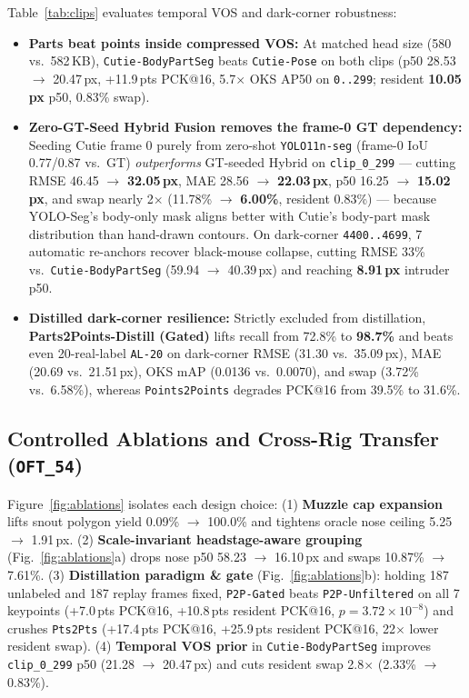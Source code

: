 \documentclass[10pt,twocolumn,letterpaper]{article}
\begin{document}
Table~\ref{tab:clips} evaluates temporal VOS and dark-corner robustness:
\begin{itemize}[leftmargin=*,itemsep=0.5pt,topsep=1.5pt]
  \item \textbf{Parts beat points inside compressed VOS:} At matched head size (580 vs.\ 582\,KB), \texttt{Cutie-BodyPartSeg} beats \texttt{Cutie-Pose} on both clips (p50 28.53 $\to$ 20.47\,px, +11.9\,pts PCK@16, 5.7$\times$ OKS AP50 on \texttt{0..299}; resident \textbf{10.05\,px} p50, 0.83\% swap).
  \item \textbf{Zero-GT-Seed Hybrid Fusion removes the frame-0 GT dependency:} Seeding Cutie frame 0 purely from zero-shot \texttt{YOLO11n-seg} (frame-0 IoU 0.77/0.87 vs.\ GT) \emph{outperforms} GT-seeded Hybrid on \texttt{clip\_0\_299} — cutting RMSE 46.45 $\to$ \textbf{32.05\,px}, MAE 28.56 $\to$ \textbf{22.03\,px}, p50 16.25 $\to$ \textbf{15.02\,px}, and swap nearly 2$\times$ (11.78\% $\to$ \textbf{6.00\%}, resident 0.83\%) — because YOLO-Seg's body-only mask aligns better with Cutie's body-part mask distribution than hand-drawn contours. On dark-corner \texttt{4400..4699}, 7 automatic re-anchors recover black-mouse collapse, cutting RMSE 33\% vs.\ \texttt{Cutie-BodyPartSeg} (59.94 $\to$ 40.39\,px) and reaching \textbf{8.91\,px} intruder p50.
  \item \textbf{Distilled dark-corner resilience:} Strictly excluded from distillation, \textbf{Parts2Points-Distill (Gated)} lifts recall from 72.8\% to \textbf{98.7\%} and beats even 20-real-label \texttt{AL-20} on dark-corner RMSE (31.30 vs.\ 35.09\,px), MAE (20.69 vs.\ 21.51\,px), OKS mAP (0.0136 vs.\ 0.0070), and swap (3.72\% vs.\ 6.58\%), whereas \texttt{Points2Points} degrades PCK@16 from 39.5\% to 31.6\%.
\end{itemize}

\subsection{Controlled Ablations and Cross-Rig Transfer (\texttt{OFT\_54})}

Figure~\ref{fig:ablations} isolates each design choice: (1) \textbf{Muzzle cap expansion} lifts snout polygon yield 0.09\% $\to$ 100.0\% and tightens oracle nose ceiling 5.25 $\to$ 1.91\,px. (2) \textbf{Scale-invariant headstage-aware grouping} (Fig.~\ref{fig:ablations}a) drops nose p50 58.23 $\to$ 16.10\,px and swaps 10.87\% $\to$ 7.61\%. (3) \textbf{Distillation paradigm \& gate} (Fig.~\ref{fig:ablations}b): holding 187 unlabeled and 187 replay frames fixed, \texttt{P2P-Gated} beats \texttt{P2P-Unfiltered} on all 7 keypoints (+7.0\,pts PCK@16, +10.8\,pts resident PCK@16, $p=3.72\times 10^{-8}$) and crushes \texttt{Pts2Pts} (+17.4\,pts PCK@16, +25.9\,pts resident PCK@16, 22$\times$ lower resident swap). (4) \textbf{Temporal VOS prior} in \texttt{Cutie-BodyPartSeg} improves \texttt{clip\_0\_299} p50 (21.28 $\to$ 20.47\,px) and cuts resident swap 2.8$\times$ (2.33\% $\to$ 0.83\%).
\end{document}
